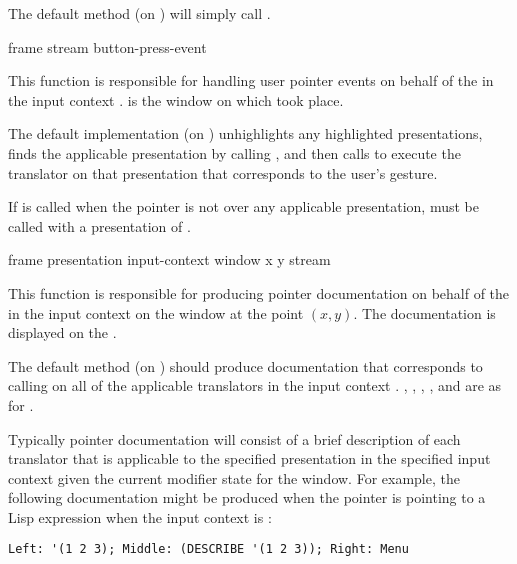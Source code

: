 The default method (on ) will simply call
.

 {frame stream button-press-event}

This function is responsible for handling user pointer events on behalf of the
  in the input context .
 is the window on which  took place.

The default implementation (on ) unhighlights any
highlighted presentations, finds the applicable presentation by calling
, and then calls
 to execute the translator on that
presentation that corresponds to the user's gesture.

If  is called when the pointer is
not over any applicable presentation,  must
be called with a presentation of .


 {frame presentation input-context window x y stream}

This function is responsible for producing pointer documentation on behalf of
the   in the input context  on the
window  at the point $(x,y)$.  The documentation is displayed on the
 .

The default method (on ) should produce
documentation that corresponds to calling 
on all of the applicable translators in the input context .
, , , , and  are as for
.

Typically pointer documentation will consist of a brief description of each
translator that is applicable to the specified presentation in the specified
input context given the current modifier state for the window.  For example, the
following documentation might be produced when the pointer is pointing to a Lisp
expression when the input context is :

\begin{verbatim}
Left: '(1 2 3); Middle: (DESCRIBE '(1 2 3)); Right: Menu
\end{verbatim}


